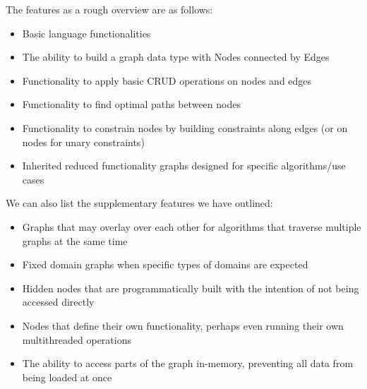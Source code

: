 The features as a rough overview are as follows:
\begin{itemize}
    \item Basic language functionalities
    \item The ability to build a graph data type with Nodes connected by Edges
    \item Functionality to apply basic CRUD operations on nodes and edges
    \item Functionality to find optimal paths between nodes
    \item Functionality to constrain nodes by building constraints along edges (or on nodes for unary constraints)
    \item Inherited reduced functionality graphs designed for specific algorithms/use cases
\end{itemize}

We can also list the supplementary features we have outlined:
\begin{itemize}
    \item Graphs that may overlay over each other for algorithms that traverse multiple graphs at the same time
    \item Fixed domain graphs when specific types of domains are expected
    \item Hidden nodes that are programmatically built with the intention of not being accessed directly
    \item Nodes that define their own functionality, perhaps even running their own multithreaded operations
    \item The ability to access parts of the graph in-memory, preventing all data from being loaded at once
\end{itemize}